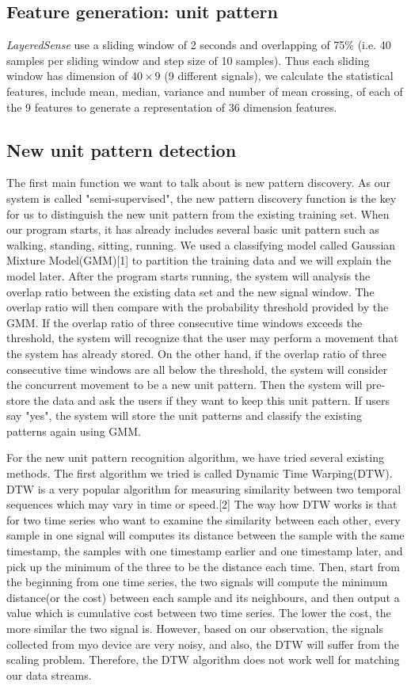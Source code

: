 \documentclass[a4paper, 10pt, conference]{IEEEtran}      %
\begin{document}
\subsection{Feature generation: unit pattern}
\emph{LayeredSense} use a sliding window of 2 seconds and overlapping of 75\% (i.e. 40 samples per sliding window and step size of 10 samples).  Thus each sliding window has dimension of $40 \times 9$ (9 different signals), we calculate the statistical features, include mean, median, variance and number of mean crossing, of each of the 9 features to generate a representation of 36 dimension features. 

\subsection{New unit pattern detection}
The first main function we want to talk about is new pattern discovery. As our system is called "semi-supervised", the new pattern discovery function is the key for us to distinguish the new unit pattern from the existing training set. When our program starts, it has already includes several basic unit pattern such as walking, standing, sitting, running. We used a classifying model called Gaussian Mixture Model(GMM)[1] to partition the training data and we will explain the model later. After the program starts running, the system will analysis the overlap ratio between the existing data set and the new signal window. The overlap ratio will then compare with the probability threshold provided by the GMM. If the overlap ratio of three consecutive time windows exceeds the threshold, the system will recognize that the user may perform a movement that the system has already stored. On the other hand, if the overlap ratio of three consecutive time windows are all below the threshold, the system will consider the concurrent movement to be a new unit pattern. Then the system will pre-store the data and ask the users if they want to keep this unit pattern. If users say "yes", the system will store the unit patterns and classify the existing patterns again using GMM.\par
For the new unit pattern recognition algorithm, we have tried several existing methods. The first algorithm we tried is called Dynamic Time Warping(DTW). DTW is a very popular algorithm for measuring similarity between two temporal sequences which may vary in time or speed.[2] The way how DTW works is that for two time series who want to examine the similarity between each other, every sample in one signal will computes its distance between the sample with the same timestamp, the samples with one timestamp earlier and one timestamp later, and pick up the minimum of the three to be the distance each time. Then, start from the beginning from one time series, the two signals will compute the minimum distance(or the cost) between each sample and its neighbours, and then output a value which is cumulative cost between two time series. The lower the cost, the more similar the two signal is. However, based on our observation, the signals collected from myo device are very noisy, and also, the DTW will suffer from the scaling problem. Therefore, the DTW algorithm does not work well for matching our data streams.\par
\end{document}
